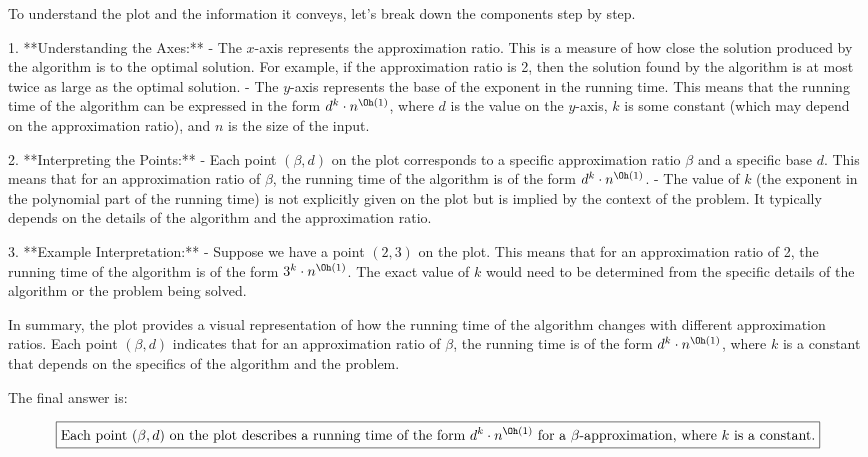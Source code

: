 To understand the plot and the information it conveys, let's break down the components step by step.

1. **Understanding the Axes:**
   - The \( x \)-axis represents the approximation ratio. This is a measure of how close the solution produced by the algorithm is to the optimal solution. For example, if the approximation ratio is 2, then the solution found by the algorithm is at most twice as large as the optimal solution.
   - The \( y \)-axis represents the base of the exponent in the running time. This means that the running time of the algorithm can be expressed in the form \( d^k \cdot n^{\Oh(1)} \), where \( d \) is the value on the \( y \)-axis, \( k \) is some constant (which may depend on the approximation ratio), and \( n \) is the size of the input.

2. **Interpreting the Points:**
   - Each point \((\beta, d)\) on the plot corresponds to a specific approximation ratio \(\beta\) and a specific base \( d \). This means that for an approximation ratio of \(\beta\), the running time of the algorithm is of the form \( d^k \cdot n^{\Oh(1)} \).
   - The value of \( k \) (the exponent in the polynomial part of the running time) is not explicitly given on the plot but is implied by the context of the problem. It typically depends on the details of the algorithm and the approximation ratio.

3. **Example Interpretation:**
   - Suppose we have a point \((2, 3)\) on the plot. This means that for an approximation ratio of 2, the running time of the algorithm is of the form \( 3^k \cdot n^{\Oh(1)} \). The exact value of \( k \) would need to be determined from the specific details of the algorithm or the problem being solved.

In summary, the plot provides a visual representation of how the running time of the algorithm changes with different approximation ratios. Each point \((\beta, d)\) indicates that for an approximation ratio of \(\beta\), the running time is of the form \( d^k \cdot n^{\Oh(1)} \), where \( k \) is a constant that depends on the specifics of the algorithm and the problem.

The final answer is:

\[
\boxed{\text{Each point } (\beta, d) \text{ on the plot describes a running time of the form } d^k \cdot n^{\Oh(1)} \text{ for a } \beta\text{-approximation, where } k \text{ is a constant.}}
\]
